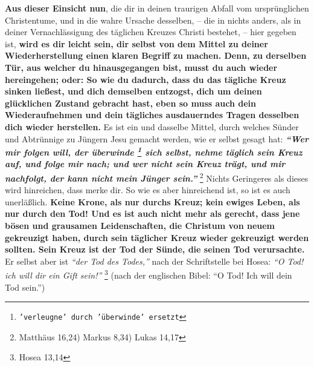 \label{ref:02_10_abhilfe} \textbf{Aus dieser Einsicht nun}, die
dir in deinen traurigen Abfall vom ursprünglichen
Christentume, und in die wahre Ursache desselben, -- die in nichts anders, als
in deiner Vernachlässigung des täglichen Kreuzes Christi bestehet, -- hier
gegeben ist, \textbf{wird es dir leicht sein, dir selbst von dem Mittel zu
deiner
Wiederherstellung einen klaren Begriff zu machen. Denn, zu derselben Tür, aus
welcher du hinausgegangen bist, musst du auch wieder hereingehen; oder: So wie du
dadurch, dass du das tägliche Kreuz sinken ließest, und dich demselben entzogst,
dich um deinen glücklichen Zustand gebracht hast, eben so muss auch dein
Wiederaufnehmen und dein tägliches ausdauerndes Tragen desselben dich wieder
herstellen.} Es ist ein und dasselbe Mittel, durch welches Sünder und Abtrünnige
zu Jüngern Jesu gemacht werden, wie er selbst gesagt hat:
\textbf{\textit{"`Wer mir
folgen will, der überwinde
\footnote{\texttt{'verleugne' durch 'überwinde' ersetzt}}
sich selbst, nehme täglich sein Kreuz auf, und folge
mir nach; und wer nicht sein Kreuz trägt, und mir nachfolgt, der kann nicht mein
Jünger sein."'}}
\footnote{Matthäus 16,24) Markus 8,34) Lukas 14,17}
 Nichts
Geringeres als dieses wird hinreichen, dass merke dir. So wie es aber hinreichend
ist, so ist es auch unerläßlich. \textbf{Keine Krone, als nur durchs Kreuz;
kein ewiges Leben, als nur durch den Tod!
Und es ist auch nicht mehr als gerecht, dass jene
bösen und grausamen Leidenschaften, die Christum von neuem gekreuzigt haben,
durch sein täglicher Kreuz wieder gekreuzigt werden sollten. Sein Kreuz ist der
Tod der Sünde, die seinen Tod verursachte.} Er selbst aber ist
\textit{"`der Tod des Todes,"'} nach der Schriftstelle bei Hosea:
\textit{"`O Tod! ich will dir ein Gift sein!"'}
\footnote{Hosea 13,14}
 (nach der englischen Bibel: "`O Tod! Ich will
dein
Tod sein."')


